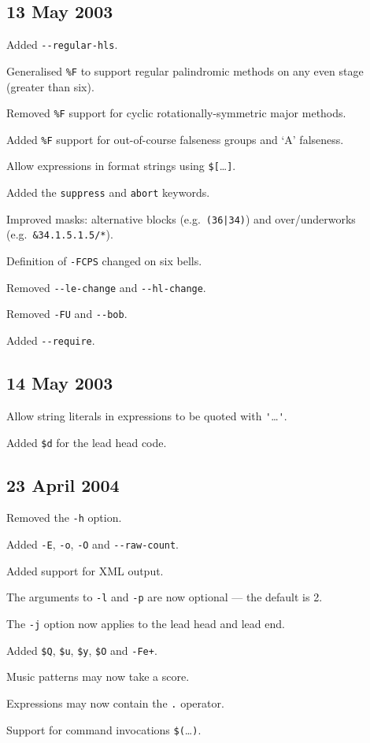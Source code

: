 \documentclass[a4paper,11pt,oneside]{book}
\begin{document}
\subsection{13 May 2003}
\begin{list}{}{\leftmargin=1em}
\item Added \verb+--regular-hls+.
\item Generalised \verb+%F+ to support regular palindromic methods on any 
even stage (greater than six).
\item Removed \verb+%F+ support for cyclic rotationally-symmetric
major methods.
\item Added \verb+%F+ support for out-of-course falseness groups and `A' 
falseness.
\item Allow expressions in format strings using \verb+$[+\ldots\verb+]+.
\item Added the \verb+suppress+ and \verb+abort+ keywords.
\item Improved masks: alternative blocks (e.g.\ \verb+(36|34)+) and 
over/underworks (e.g.\ \verb+&34.1.5.1.5/*+).
\item Definition of \verb+-FCPS+ changed on six bells.
\item Removed \verb+--le-change+ and \verb+--hl-change+.
\item Removed \verb+-FU+ and \verb+--bob+.
\item Added \verb+--require+.
\end{list}

\subsection{14 May 2003}
\begin{list}{}{\leftmargin=1em}
\item Allow string literals in expressions to be quoted with 
\verb+'+\ldots\verb+'+.
\item Added \verb+$d+ for the lead head code.
\end{list}

\subsection{23 April 2004}
\begin{list}{}{\leftmargin=1em}
\item Removed the \verb+-h+ option.
\item Added \verb+-E+, \verb+-o+, \verb+-O+ and \verb+--raw-count+.
\item Added support for XML output.
\item The arguments to \verb+-l+ and \verb+-p+ are now optional — 
the default is 2.
\item The \verb+-j+ option now applies to the lead head and lead end.
\item Added \verb+$Q+, \verb+$u+, \verb+$y+, \verb+$O+ and \verb!-Fe+!.
\item Music patterns may now take a score.
\item Expressions may now contain the \verb+.+ operator.
\item Support for command invocations \verb+$(+\ldots\verb+)+.
\end{list}
\end{document}
